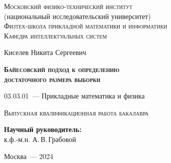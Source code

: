 \thispagestyle{empty}

\begin{titlepage}
    \begin{center}
        \textsc{Московский физико-технический институт}\\
        (национальный исследовательский университет)\\
        \textsc{Физтех-школа прикладной математики и информатики}\\
        \textsc{Кафедра интеллектуальных систем}
        \end{center}
        \vspace{2.5cm}
        \begin{center}
        {Киселев Никита Сергеевич}
        \par
        \vspace{2cm}
        {\Large \textsc{\textbf{Байесовский подход к определению\\ достаточного размера выборки}}}
        \par
        \vspace{2cm}
        {03.03.01~--- Прикладные математика и физика}
        \par
        \vspace{2cm}
        \textsc{Выпускная квалификационная работа бакалавра}
        \end{center}
        \vspace{2cm}
        \hfill\parbox{8,4cm}{\textbf{Научный руководитель:}
        \\к.ф.-м.н. А.\,В.\,Грабовой}
        \par
        \vspace{2.5cm}
        \begin{center}
        {Москва~--- 2024}
    \end{center}
\end{titlepage}